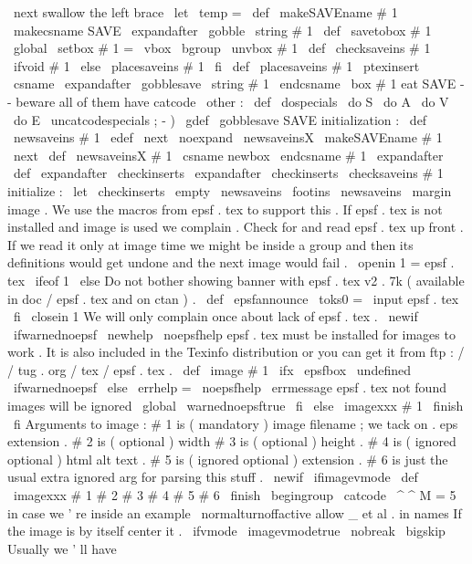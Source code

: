 {{\
next
%
swallow
the
left
brace
\
let
\
temp
=
}
\
def
\
makeSAVEname
#
1
{
\
makecsname
{
SAVE
\
expandafter
\
gobble
\
string
#
1
}
}
\
def
\
savetobox
#
1
{
\
global
\
setbox
#
1
=
\
vbox
\
bgroup
\
unvbox
#
1
}
\
def
\
checksaveins
#
1
{
\
ifvoid
#
1
\
else
\
placesaveins
#
1
\
fi
}
\
def
\
placesaveins
#
1
{
%
\
ptexinsert
\
csname
\
expandafter
\
gobblesave
\
string
#
1
\
endcsname
{
\
box
#
1
}
%
}
%
eat
SAVE
-
-
beware
all
of
them
have
catcode
\
other
:
{
\
def
\
dospecials
{
\
do
S
\
do
A
\
do
V
\
do
E
}
\
uncatcodespecials
%
;
-
)
\
gdef
\
gobblesave
SAVE
{
}
}
%
initialization
:
\
def
\
newsaveins
#
1
{
%
\
edef
\
next
{
\
noexpand
\
newsaveinsX
\
makeSAVEname
#
1
}
%
\
next
}
\
def
\
newsaveinsX
#
1
{
%
\
csname
newbox
\
endcsname
#
1
%
\
expandafter
\
def
\
expandafter
\
checkinserts
\
expandafter
{
\
checkinserts
\
checksaveins
#
1
}
%
}
%
initialize
:
\
let
\
checkinserts
\
empty
\
newsaveins
\
footins
\
newsaveins
\
margin
%
image
.
We
use
the
macros
from
epsf
.
tex
to
support
this
.
%
If
epsf
.
tex
is
not
installed
and
image
is
used
we
complain
.
%
%
Check
for
and
read
epsf
.
tex
up
front
.
If
we
read
it
only
at
image
%
time
we
might
be
inside
a
group
and
then
its
definitions
would
get
%
undone
and
the
next
image
would
fail
.
\
openin
1
=
epsf
.
tex
\
ifeof
1
\
else
%
Do
not
bother
showing
banner
with
epsf
.
tex
v2
.
7k
(
available
in
%
doc
/
epsf
.
tex
and
on
ctan
)
.
\
def
\
epsfannounce
{
\
toks0
=
}
%
\
input
epsf
.
tex
\
fi
\
closein
1
%
%
We
will
only
complain
once
about
lack
of
epsf
.
tex
.
\
newif
\
ifwarnednoepsf
\
newhelp
\
noepsfhelp
{
epsf
.
tex
must
be
installed
for
images
to
work
.
It
is
also
included
in
the
Texinfo
distribution
or
you
can
get
it
from
ftp
:
/
/
tug
.
org
/
tex
/
epsf
.
tex
.
}
%
\
def
\
image
#
1
{
%
\
ifx
\
epsfbox
\
undefined
\
ifwarnednoepsf
\
else
\
errhelp
=
\
noepsfhelp
\
errmessage
{
epsf
.
tex
not
found
images
will
be
ignored
}
%
\
global
\
warnednoepsftrue
\
fi
\
else
\
imagexxx
#
1
\
finish
\
fi
}
%
%
Arguments
to
image
:
%
#
1
is
(
mandatory
)
image
filename
;
we
tack
on
.
eps
extension
.
%
#
2
is
(
optional
)
width
#
3
is
(
optional
)
height
.
%
#
4
is
(
ignored
optional
)
html
alt
text
.
%
#
5
is
(
ignored
optional
)
extension
.
%
#
6
is
just
the
usual
extra
ignored
arg
for
parsing
this
stuff
.
\
newif
\
ifimagevmode
\
def
\
imagexxx
#
1
#
2
#
3
#
4
#
5
#
6
\
finish
{
\
begingroup
\
catcode
\
^
^
M
=
5
%
in
case
we
'
re
inside
an
example
\
normalturnoffactive
%
allow
_
et
al
.
in
names
%
If
the
image
is
by
itself
center
it
.
\
ifvmode
\
imagevmodetrue
\
nobreak
\
bigskip
%
Usually
we
'
ll
have
}}
